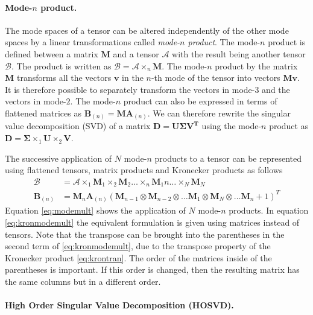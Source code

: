 \documentclass[11pt,a4paper,twoside]{report}
\begin{document}
\paragraph{Mode-$n$ product.}
The mode spaces of
a tensor can be altered independently of the other
mode spaces by a linear transformations called \textit{mode-$n$ product}. The
mode-$n$ product is defined between a matrix $\mathbf{M}$ and a tensor
$\mathcal{A}$ with the result being another tensor $\mathcal{B}$. The product is
written as $\mathcal{B} = \mathcal{A} \times_n \mathbf{M}$. The mode-$n$ product
by the matrix $\mathbf{M}$ transforms all the vectors $\mathbf{v}$ in the $n$-th mode of the tensor into vectors
$\mathbf{M}\mathbf{v}$. It is therefore possible to separately transform the vectors in
mode-$3$ and the vectors in mode-$2$. The mode-$n$ product can also be expressed in
terms of flattened matrices as $\mathbf{B}_{(n)} = \mathbf{M} \mathbf{A}_{(n)}
$. We can therefore rewrite the singular value decomposition (SVD) of a matrix $\mathbf{D
  = U\Sigma V^T}$ using the mode-$n$ product as $\mathbf{D} = \mathbf{\Sigma} \times_1
\mathbf{U} \times_2 \mathbf{V}$. 

The successive application of $N$ mode-$n$ products to a tensor can be
represented using flattened tensors, matrix products and Kronecker products as follows
\begin{align}\label{eq:modemult}
\mathcal{B} &= \mathcal{A} \times_1 \mathbf{M}_1 \times_2 \mathbf{M}_2  \ldots
\times_n \mathbf{M}_1n \ldots \times_N \mathbf{M}_N\\
\label{eq:kronmodemult}
\mathbf{B}_{(n)} &= \mathbf{M}_n \mathbf{A}_{(n)} (\mathbf{M}_{n-1} \otimes
\mathbf{M}_{n-2} \otimes \ldots \mathbf{M}_1 \otimes \mathbf{M}_N \otimes \ldots \mathbf{M}_n+1)^T 
\end{align}
Equation \ref{eq:modemult} shows the application of $N$ mode-$n$
products. In equation \ref{eq:kronmodemult} the equivalent formulation is given
using matrices instead of tensors. Note that the transpose can be brought into
the parentheses in the second term of
\ref{eq:kronmodemult}, due to the transpose property of
the Kronecker product \ref{eq:krontran}. The order of the matrices inside of the
parentheses is important. If this order is changed, then the resulting matrix has the
same columns but in a different order.
\paragraph{High Order Singular Value Decomposition (HOSVD).}
\end{document}
